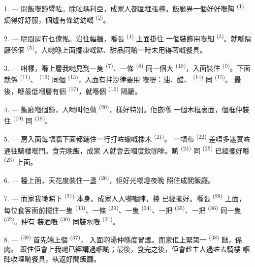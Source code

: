1. --- 開飯嘅鐘響咗。除咗瑪利亞，成家人都圍埋張檯。飯廳畀一個好好嘅陶
 \textsuperscript{(1)} 焗得好舒服，個爐有條幼幼嘅
\textsuperscript{(2)}。

2. --- 呢間房冇乜傢俬。沿住幅牆，喺張 \textsuperscript{(4)} 上面掛住
一個裝飾用嘅細 \textsuperscript{(3)}。就喺隔籬係個
\textsuperscript{(5)}，人哋喺上面擺凍嘅餸、甜品同啲一時未用得著嘅餐具。

3. --- 咁樣，喺上層我哋見到一隻 \textsuperscript{(7)}、一條
\textsuperscript{(8)} 同一個大 \textsuperscript{(10)}，入面裝住
 \textsuperscript{(9)}。下面就係 \textsuperscript{(11)}、
\textsuperscript{(12)} 同個 \textsuperscript{(13)}，入面有拌沙律要用
嘅嘢：油、醋、 \textsuperscript{(14)} 同 \textsuperscript{(15)}。
最後，喺最低嗰層有個 \textsuperscript{(17)}，就喺個
\textsuperscript{(16)} 隔籬。

4. --- 飯廳嗰個鐘，人哋叫佢做 \textsuperscript{(20)}，樣好特別。佢嵌喺
一個木框裏面，個框仲裝住 \textsuperscript{(19)} 同
\textsuperscript{(18)}。

\VUsaut{4.6mm}
\VUsaut{3.0mm}

5. --- 房入面每幅牆下面都鋪住一行打咗蠟嘅橡木 \textsuperscript{(21)}。
一幅布 \textsuperscript{(22)} 差唔多遮實咗通往騎樓嘅門。食完晚飯，成家
人就會去嗰度飲咖啡。啲 \textsuperscript{(24)} 同
\textsuperscript{(25)} 已經擺好喺 \textsuperscript{(23)} 上面。

6. --- 檯上面，天花度裝住一盞 \textsuperscript{(26)}，佢好光嘅燈夜晚
照住成間飯廳。

7. --- 而家我哋睇下 \textsuperscript{(27)} 本身。成家人入嚟嗰陣，檯
已經擺好。喺張 \textsuperscript{(28)} 上面，每位食客面前擺住一隻
 \textsuperscript{(33)}、一條 \textsuperscript{(29)}、一隻
 \textsuperscript{(34)}、一把 \textsuperscript{(35)}、一把
 \textsuperscript{(36)} 同一隻 \textsuperscript{(32)}。仲有
裝酒嘅 \textsuperscript{(30)} 同裝水嘅 \textsuperscript{(31)}。

8. ---  \textsuperscript{(39)} 首先端上個 \textsuperscript{(37)}，
入面啲湯仲喺度冒煙。而家佢上緊第一 \textsuperscript{(38)} 餸，係肉。
跟住佢會上我哋已經講過嗰啲；最後，食完之後，佢會趁主人過咗去騎樓
嗰陣收埋啲餐具，執返好間飯廳。

